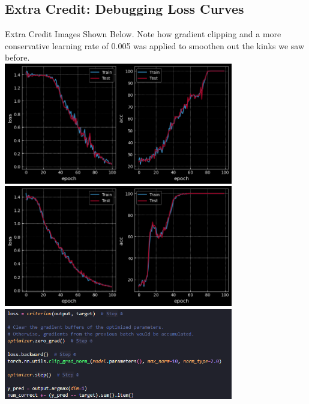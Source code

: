 \documentclass{article}
\begin{document}
\subsection*{Extra Credit: Debugging Loss Curves}

\begin{tcolorbox}
  Extra Credit Images Shown Below. Note how gradient clipping and a more conservative learning rate of 0.005 was applied to smoothen out the kinks we saw before.\\
  \includegraphics[width=10cm]{"extra_credit_1.png"}\\
  \includegraphics[width=10cm]{"extra_credit_2.png"}\\
  \includegraphics[width=10cm]{"extra_credit_3.png"}\\
\end{tcolorbox}
\end{document}
